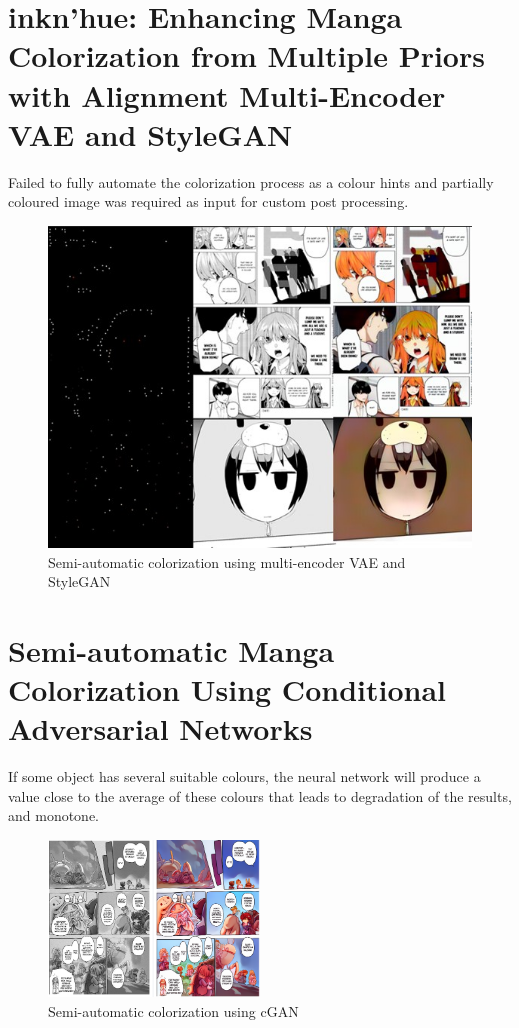     \section{inkn’hue: Enhancing Manga Colorization from Multiple Priors with Alignment Multi-Encoder VAE and StyleGAN\cite{jiramahapokee2023inkn}}
    Failed to fully automate the colorization process as a colour hints and partially coloured image was required as input for custom post processing.
    \begin{figure}[htbp]
        \centering
        \includegraphics[height=0.4\textwidth]{img/model4.jpg}
        \caption{Semi-automatic colorization using multi-encoder VAE and StyleGAN}
        \label{fig:Model-4}
      \end{figure}
     \section{Semi-automatic Manga Colorization Using Conditional Adversarial Networks\cite{10.1007/978-3-030-72610-2_17}}
    If some object has several suitable colours, the neural network will produce a value
    close to the average of these colours that leads to degradation of the results, and monotone. 
    \begin{figure}[htbp]
        \centering
        \includegraphics[width=0.5\textwidth]{img/model5.png}
        \caption{Semi-automatic colorization using cGAN}
        \label{fig:Model-5}
      
      \end{figure}

